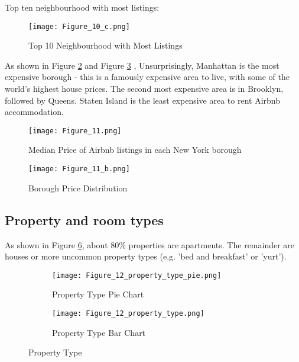Top ten neighbourhood with most listings:

\begin{figure}[H] \centering
\caption{Top 10 Neighbourhood with Most Listings}
    \texttt{[image: Figure\_10\_c.png]}
    \label{fig:top-ten-most-listing-neighbourhood}
\end{figure}



As shown in Figure \ref{fig:median-price-borough} and Figure
\ref{fig:borough-price-distribution} , Unsurprisingly, Manhattan is the most
expensive borough - this is a famously expensive area to live, with some of the
world's highest house prices. The second most expensive area is in Brooklyn,
followed by Queens. Staten Island is the least expensive area to rent Airbnb
accommodation.

\begin{figure}[H]\centering
    \caption{Median Price of Airbnb listings in each New York borough}
    \texttt{[image: Figure\_11.png]}
    \label{fig:median-price-borough}
\end{figure}

\begin{figure}[H]\centering
    \caption{Borough Price Distribution}
    \texttt{[image: Figure\_11\_b.png]}
    \label{fig:borough-price-distribution}
\end{figure}

\subsection{Property and room types}

As shown in Figure \ref{fig:property_type},
about 80\% properties are apartments. The remainder are houses or more uncommon
property types (e.g. 'bed and breakfast' or 'yurt').

\begin{figure}[H]
    \centering
    \begin{subfigure}[b]{0.48\textwidth}
        \centering
        \caption{Property Type Pie Chart}
        \texttt{[image: Figure\_12\_property\_type\_pie.png]}
        \label{fig:property_type_pie}
    \end{subfigure}
    \begin{subfigure}[b]{0.48\textwidth}
        \centering
        \caption{Property Type Bar Chart}
        \texttt{[image: Figure\_12\_property\_type.png]}
        \label{fig:property_type_bar}
    \end{subfigure}

    \caption{Property Type}
    \label{fig:property_type}
\end{figure}

